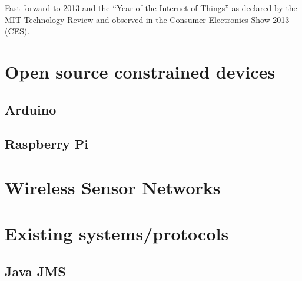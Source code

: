 \documentclass{l4proj}
\begin{document}
Fast forward to 2013 and the ``Year of the Internet of Things'' as declared by the MIT Technology Review\cite{2013IoT} and observed in the Consumer Electronics Show 2013 (CES).





\section{Open source constrained devices} %
\label{sec:open_source_constrained_devices}
\subsection{Arduino} %
\label{sub:arduino}


\subsection{Raspberry Pi} %
\label{sub:raspberry_pi}

\section{Wireless Sensor Networks} %
\label{sec:wireless_sensor_networks}


\section{Existing systems/protocols} %
\label{sec:existing_systems_protocols}

\subsection{Java JMS} %
\label{sub:java_jms}
\end{document}
